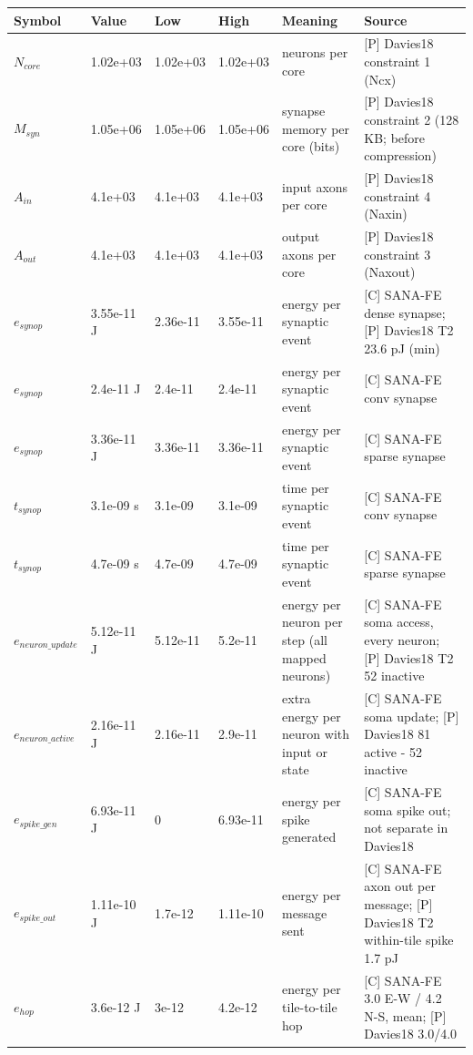 \begin{tabular}{@{}llllll@{}}
\toprule
Symbol & Value & Low & High & Meaning & Source \\
\midrule
$N_{core}$ & 1.02e+03  & 1.02e+03 & 1.02e+03 & neurons per core & [P] Davies18 constraint 1 (Ncx) \\
$M_{syn}$ & 1.05e+06  & 1.05e+06 & 1.05e+06 & synapse memory per core (bits) & [P] Davies18 constraint 2 (128 KB; before compression) \\
$A_{in}$ & 4.1e+03  & 4.1e+03 & 4.1e+03 & input axons per core & [P] Davies18 constraint 4 (Naxin) \\
$A_{out}$ & 4.1e+03  & 4.1e+03 & 4.1e+03 & output axons per core & [P] Davies18 constraint 3 (Naxout) \\
$e_{synop}$ & 3.55e-11 J & 2.36e-11 & 3.55e-11 & energy per synaptic event & [C] SANA-FE dense synapse; [P] Davies18 T2 23.6 pJ (min) \\
$e_{synop}$ & 2.4e-11 J & 2.4e-11 & 2.4e-11 & energy per synaptic event & [C] SANA-FE conv synapse \\
$e_{synop}$ & 3.36e-11 J & 3.36e-11 & 3.36e-11 & energy per synaptic event & [C] SANA-FE sparse synapse \\
$t_{synop}$ & 3.1e-09 s & 3.1e-09 & 3.1e-09 & time per synaptic event & [C] SANA-FE conv synapse \\
$t_{synop}$ & 4.7e-09 s & 4.7e-09 & 4.7e-09 & time per synaptic event & [C] SANA-FE sparse synapse \\
$e_{neuron\_update}$ & 5.12e-11 J & 5.12e-11 & 5.2e-11 & energy per neuron per step (all mapped neurons) & [C] SANA-FE soma access, every neuron; [P] Davies18 T2 52 inactive \\
$e_{neuron\_active}$ & 2.16e-11 J & 2.16e-11 & 2.9e-11 & extra energy per neuron with input or state & [C] SANA-FE soma update; [P] Davies18 81 active - 52 inactive \\
$e_{spike\_gen}$ & 6.93e-11 J & 0 & 6.93e-11 & energy per spike generated & [C] SANA-FE soma spike out; not separate in Davies18 \\
$e_{spike\_out}$ & 1.11e-10 J & 1.7e-12 & 1.11e-10 & energy per message sent & [C] SANA-FE axon out per message; [P] Davies18 T2 within-tile spike 1.7 pJ \\
$e_{hop}$ & 3.6e-12 J & 3e-12 & 4.2e-12 & energy per tile-to-tile hop & [C] SANA-FE 3.0 E-W / 4.2 N-S, mean; [P] Davies18 3.0/4.0 \\

\end{tabular}
